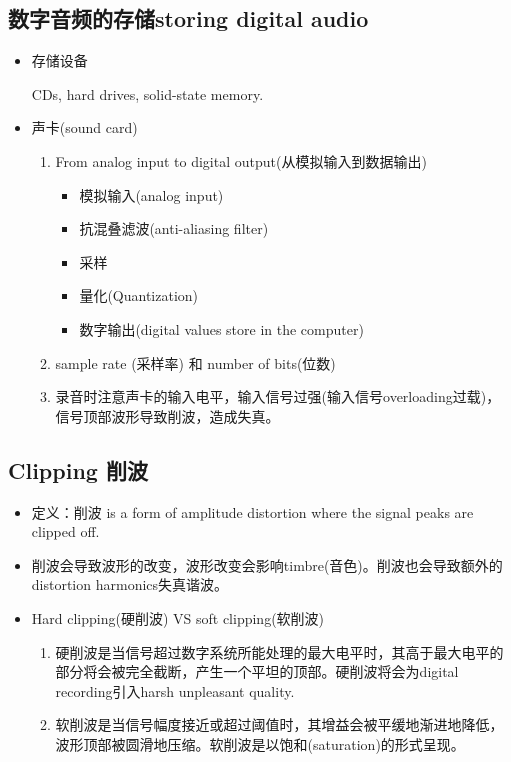 \documentclass[UTF8]{ctexart}
\begin{document}
\subsection{数字音频的存储storing digital audio}
\begin{itemize}
    \item 存储设备
    
    CDs, hard drives, solid-state memory.

    \item 声卡(sound card)
    \begin{enumerate}
        \item From analog input to digital output(从模拟输入到数据输出)
        \begin{itemize}
            \item 模拟输入(analog input)
            \item 抗混叠滤波(anti-aliasing filter)
            \item 采样
            \item 量化(Quantization)
            \item 数字输出(digital values store in the computer)
        \end{itemize}
        \item sample rate (采样率) 和 number of bits(位数)
        \item 录音时注意声卡的输入电平，输入信号过强(输入信号overloading过载)，信号顶部波形导致削波，造成失真。
    \end{enumerate}
\end{itemize}

\subsection{Clipping 削波}

\begin{itemize}
    \item 定义：削波 is a form of amplitude distortion where the signal peaks are clipped off.
    \item 削波会导致波形的改变，波形改变会影响timbre(音色)。削波也会导致额外的distortion harmonics失真谐波。
    \item Hard clipping(硬削波) VS soft clipping(软削波)
    \begin{enumerate}
        \item 硬削波是当信号超过数字系统所能处理的最大电平时，其高于最大电平的部分将会被完全截断，产生一个平坦的顶部。硬削波将会为digital recording引入harsh unpleasant quality.
        \item 软削波是当信号幅度接近或超过阈值时，其增益会被平缓地渐进地降低，波形顶部被圆滑地压缩。软削波是以饱和(saturation)的形式呈现。
    \end{enumerate}

\end{itemize}
\end{document}
